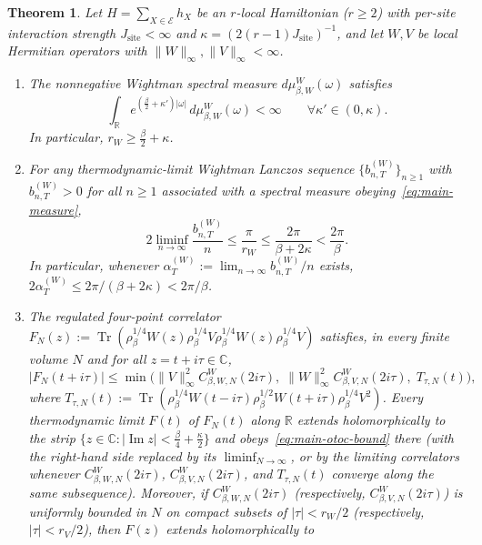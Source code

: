 \documentclass[11pt,a4paper]{article}
\numberwithin{equation}{section}
\theoremstyle{plain}
\newtheorem{theorem}{Theorem}[section]
\theoremstyle{definition}
\newcommand{\Tr}{\operatorname{Tr}}
\begin{document}
\begin{theorem}\label{thm:main-spectral}
Let $H = \sum_{X\in\mathcal{E}} h_X$ be an $r$-local Hamiltonian ($r\ge 2$) with per-site interaction strength $J_{\mathrm{site}} < \infty$ and $\kappa = (2(r-1)J_{\mathrm{site}})^{-1}$, and let $W,V$ be local Hermitian operators with $\|W\|_\infty,\|V\|_\infty < \infty$.
\begin{enumerate}
  \setlength{\itemsep}{3pt}\setlength{\parskip}{0pt}
  \item[\emph{(a)}] The nonnegative Wightman spectral measure $d\mu_{\beta,W}^W(\omega)$ satisfies
  \begin{equation}\label{eq:main-measure}
    \int_{\mathbb{R}} e^{(\frac{\beta}{2}+\kappa')|\omega|}\,d\mu_{\beta,W}^W(\omega) < \infty \qquad \forall\kappa'\in(0,\kappa).
  \end{equation}
  In particular, $r_W \ge \frac{\beta}{2}+\kappa$.
  \item[\emph{(b)}] For any thermodynamic-limit Wightman Lanczos sequence $\{b_{n,T}^{(W)}\}_{n\ge 1}$ with $b_{n,T}^{(W)} > 0$ for all $n\ge 1$ associated with a spectral measure obeying~\eqref{eq:main-measure},
  \begin{equation}\label{eq:main-right}
    2\liminf_{n\to\infty}\frac{b_{n,T}^{(W)}}{n} \le \frac{\pi}{r_W} \le \frac{2\pi}{\beta+2\kappa} < \frac{2\pi}{\beta}.
  \end{equation}
  In particular, whenever $\alpha_T^{(W)} := \lim_{n\to\infty} b_{n,T}^{(W)}/n$ exists, $2\alpha_T^{(W)} \le 2\pi/(\beta+2\kappa) < 2\pi/\beta$.
  \item[\emph{(c)}] The regulated four-point correlator $F_N(z) := \Tr(\rho_\beta^{1/4}W(z)\rho_\beta^{1/4}V\rho_\beta^{1/4}W(z)\rho_\beta^{1/4}V)$ satisfies, in every finite volume $N$ and for all $z = t + i\tau\in\mathbb{C}$,
  \begin{equation}\label{eq:main-otoc-bound}
    |F_N(t+i\tau)| \le \min\!\bigl(\|V\|_\infty^2 C_{\beta,W,N}^W(2i\tau),\; \|W\|_\infty^2 C_{\beta,V,N}^W(2i\tau),\; T_{\tau,N}(t)\bigr),
  \end{equation}
  where $T_{\tau,N}(t) := \Tr(\rho_\beta^{1/4}W(t-i\tau)\rho_\beta^{1/2}W(t+i\tau)\rho_\beta^{1/4}V^2)$. Every thermodynamic limit $F(t)$ of $F_N(t)$ along $\mathbb{R}$ extends holomorphically to the strip $\{z\in\mathbb{C} : |\operatorname{Im}z| < \frac{\beta}{4}+\frac{\kappa}{2}\}$ and obeys~\eqref{eq:main-otoc-bound} there (with the right-hand side replaced by its $\liminf_{N\to\infty}$, or by the limiting correlators whenever $C_{\beta,W,N}^W(2i\tau)$, $C_{\beta,V,N}^W(2i\tau)$, and $T_{\tau,N}(t)$ converge along the same subsequence). Moreover, if $C_{\beta,W,N}^W(2i\tau)$ (respectively, $C_{\beta,V,N}^W(2i\tau)$) is uniformly bounded in $N$ on compact subsets of $|\tau| < r_W/2$ (respectively, $|\tau| < r_V/2$), then $F(z)$ extends holomorphically to

\end{enumerate}
\end{theorem}
\end{document}
